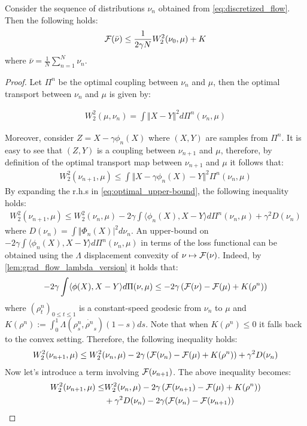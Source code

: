 \begin{theorem}
	Consider the sequence of distributions $\nu_n$ obtained from \ref{eq:discretized_flow}. Then the following holds:
	\begin{align}
		{{\mathcal F}}(\bar{\nu})\leq \frac{1}{2\gamma N}W_2^2(\nu_0,\mu) +K
	\end{align}
	where $\bar{\nu}=\frac{1}{N}\sum_{n=1}^N \nu_n$.
\end{theorem}
\begin{proof}
Let $\Pi^n$ be the optimal coupling between $\nu_n$ and $\mu$, then the optimal transport between $\nu_n$ and $\mu$ is given by:

\begin{align}
	W_2^2(\mu,\nu_n)=\int \Vert X-Y \Vert^2 d\Pi^n(\nu_n,\mu)
\end{align}

Moreover, consider $Z=X-\gamma \phi_n(X)$ where $(X,Y)$ are samples from $\Pi^n$. It is easy to see that $(Z,Y)$ is a coupling between $\nu_{n+1}$ and $\mu$, therefore, by definition of the optimal transport map between $\nu_{n+1}$ and $\mu$ it follows that:
\begin{align}\label{eq:optimal_upper-bound}
	W_2^2(\nu_{n+1},\mu)\leq \int \Vert X-\gamma \phi_{n}(X)-Y\Vert^2 \Pi^n(\nu_n,\mu)
\end{align}
By expanding the r.h.s in \ref{eq:optimal_upper-bound}, the following inequality holds:
\begin{align}\label{eq:main_inequality}
	W_2^2(\nu_{n+1},\mu)\leq W_2^2(\nu_{n},\mu) -2\gamma \int \langle \phi_n(X), X-Y \rangle d\Pi^n(\nu_n,\mu)+ \gamma^2D(\nu_n)
\end{align}
where $D(\nu_n) = \int \Vert \Phi_n(X)\vert^2 d\nu_n $.
An upper-bound on $-2\gamma \int \langle \phi_n(X), X-Y \rangle d\Pi^n(\nu_n,\mu) $ in terms of the loss functional can be obtained using the $\Lambda$ displacement convexity of $\nu\mapsto {{\mathcal F}}(\nu)$. Indeed, by \ref{lem:grad_flow_lambda_version} it holds that:
\begin{align}\label{eq:flow_upper-bound}
	-2\gamma \int \langle \phi(X),X-Y \rangle d\Pi(\nu,\mu)
	\leq
	-2\gamma\left({{\mathcal F}}(\nu)- {{\mathcal F}}(\mu) +K(\rho^n)\right)
\end{align}
where $(\rho^n_t)_{0\leq t \leq 1}$ is a constant-speed geodesic from $\nu_n$ to $\mu$ and $K(\rho^n):=\int_0^1 \Lambda(\rho^n_s,\dot{\rho^n}_s)(1-s)ds$. Note that when $K(\rho^n)\leq 0$ it falls back to the convex setting.
Therefore, the following inequality holds:
\begin{align}
	W_2^2(\nu_{n+1},\mu)\leq W_2^2(\nu_{n},\mu) - 2\gamma\left({{\mathcal F}}(\nu_n)- {{\mathcal F}}(\mu) +K(\rho^n)\right) +\gamma^2 D(\nu_n)
\end{align}
Now let's introduce a term involving ${{\mathcal F}}(\nu_{n+1})$. The above inequality becomes:
\begin{align}
	W_2^2(\nu_{n+1},\mu)\leq & W_2^2(\nu_{n},\mu) - 2\gamma\left({{\mathcal F}}(\nu_{n+1})- {{\mathcal F}}(\mu) +K(\rho^n)\right) \\
		&+\gamma^2 D(\nu_n) -2\gamma ({{\mathcal F}}(\nu_n)-{{\mathcal F}}(\nu_{n+1}))
	\label{eq:main_ineq_2}
\end{align}
 

\end{proof}

